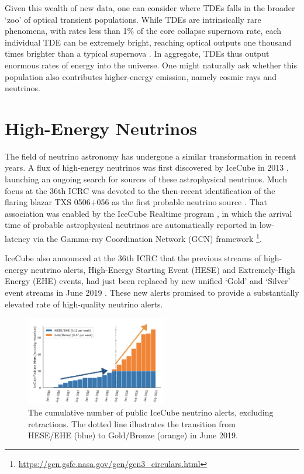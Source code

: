 \documentclass[a4paper,11pt]{article}
\begin{document}
Given this wealth of new data, one can consider where TDEs falls in the broader `zoo' of optical transient populations. 
While TDEs are intrinsically rare phenomena, with rates less than 1\% of the core collapse supernova rate, each individual TDE can be extremely bright, reaching optical outputs one thousand times brighter than a typical supernova \cite{fang_20}. In aggregate, TDEs thus output enormous rates of energy into the universe. One might naturally ask whether this population also contributes higher-energy emission, namely cosmic rays and neutrinos.

\section{High-Energy Neutrinos}

The field of neutrino astronomy has undergone a similar transformation in recent years. A flux of high-energy neutrinos was first discovered by IceCube in 2013 \cite{ic_astro_13}, launching an ongoing search for sources of these astrophysical neutrinos. Much focus at the 36th ICRC was devoted to the then-recent identification of the flaring blazar TXS 0506+056 as the first probable neutrino source \cite{ic_txs_mm_18, kappes_19}. That association was enabled by the IceCube Realtime program \cite{ic_realtime_17}, in which the arrival time of probable astrophysical neutrinos are automatically reported in low-latency via the Gamma-ray Coordination Network (GCN) framework \footnote{\url{https://gcn.gsfc.nasa.gov/gcn/gcn3_circulars.html}}.

IceCube also announced at the 36th ICRC that the previous streams of high-energy neutrino alerts, High-Energy Starting Event (HESE) and Extremely-High Energy (EHE)  events, had just been replaced by new unified `Gold' and `Silver' event streams in June 2019 \cite{ic_realtime_19}. These new alerts promised to provide a substantially elevated rate of high-quality neutrino alerts. 

\begin{figure}[!ht]
	\centering \includegraphics[width=0.55\textwidth]{figures/ic_alerts}
	\caption{The cumulative number of public IceCube neutrino alerts, excluding retractions. The dotted line illustrates the transition from HESE/EHE (blue) to Gold/Bronze (orange) in June 2019.}
	\label{fig:ic_alerts}
\end{figure}
\end{document}
